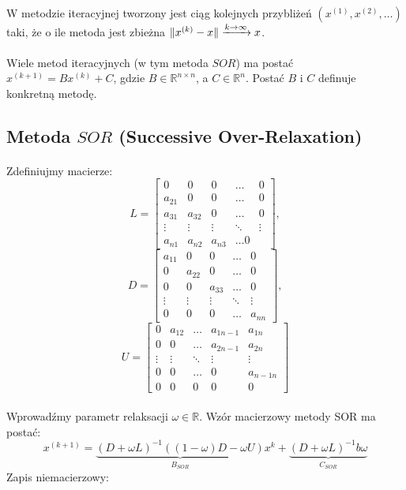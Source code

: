 \documentclass{article}
\DeclarePairedDelimiter{\norm}{\lVert}{\rVert}
\begin{document}
\paragraph{}
W metodzie iteracyjnej tworzony jest ciąg kolejnych przybliżeń 
\((x^{(1)}, x^{(2)},\dots)\)
taki, że o ile metoda jest zbieżna \(
\norm{x^{(k)}-x}\xrightarrow{k\rightarrow\infty}x
\).
\paragraph{}
Wiele metod iteracyjnych (w tym metoda $SOR$) ma postać \\ \(x^{(k+1)}=Bx^{(k)}+C\), gdzie \(B\in \mathbb{R}^{n\times n}\), a \(C\in\mathbb{R}^{n}\). Postać $B$ i $C$ definuje konkretną metodę.
\subsection {Metoda $SOR$ (Successive Over-Relaxation)}
\paragraph{}
Zdefiniujmy macierze:
\[
L = \begin{bmatrix}
  0 & 0 & 0 & \dots &0\\
  a_{21} &0 & 0 & \dots & 0\\
  a_{31} & a_{32} &0  & \dots & 0\\
 \vdots & \vdots &\vdots & \ddots & \vdots \\
  a_{n1} & a_{n2} &a_{n3} & \dots 0
\end{bmatrix},\]
\[
D = \begin{bmatrix}
  a_{11} & 0 & 0 & \dots &0\\
  0 & a_{22} & 0 & \dots & 0\\
  0 & 0  & a_{33} & \dots & 0\\
 \vdots & \vdots &\vdots & \ddots & \vdots \\
  0 & 0 & 0 & \dots & a_{nn}
\end{bmatrix},\]
\[
U = \begin{bmatrix}
  0 & a_{12} & \dots & a_{1n-1} & a_{1n} \\
  0 & 0 & \dots &  a_{2n-1} & a_{2n}\\
 \vdots & \vdots &\ddots & \vdots & \vdots \\
  0 & 0  &\dots &  0 & a_{n-1n}\\
  0 & 0 & 0 & 0 & 0
\end{bmatrix}
 \]
\paragraph{}
Wprowadźmy parametr relaksacji $\omega \in \mathbb{R}$.
Wzór macierzowy metody SOR ma postać:
\[
x^{(k+1)}=\underbrace{(D+\omega L)^{-1}((1-\omega)D-\omega U)}_{B_{SOR}}x^k + \underbrace{(D+ \omega L)^{-1}b\omega}_{C_{SOR}}
\]
Zapis niemacierzowy:
\begin{algorithmic}
\end{algorithmic}
\end{document}
